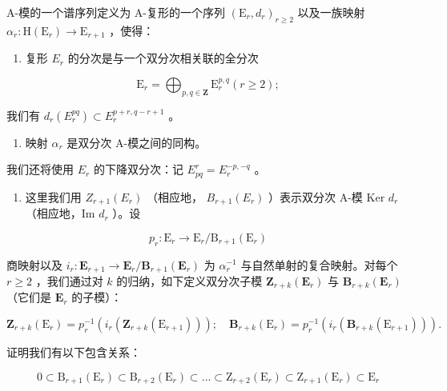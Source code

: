 A-模的一个谱序列定义为 A-复形的一个序列 \((\mathrm{E}_r, d_r)_{r \geqslant 2}\) 以及一族映射 \(\alpha_r: \mathrm{H}(\mathrm{E}_r) \to \mathrm{E}_{r+1}\) ，使得：

\begin{enumerate}
\def\labelenumi{(\roman{enumi})}
\tightlist
\item
  复形 \(E_r\) 的分次是与一个双分次相关联的全分次
\end{enumerate}

\[
\mathrm{E} _ {r} = \bigoplus_ {p, q \in \mathbf {Z}} \mathrm{E} _ {r} ^ {p, q} (r \geqslant 2);
\]

我们有 \(d_r(E_r^{pq}) \subset E_r^{p + r,q - r + 1}\) 。

\begin{enumerate}
\def\labelenumi{(\roman{enumi})}
\setcounter{enumi}{1}
\tightlist
\item
  映射 \(\alpha_{r}\) 是双分次 A-模之间的同构。
\end{enumerate}

我们还将使用 \(E_{r}\) 的下降双分次：记 \(E_{pq}^{r} = E_{r}^{-p, -q}\) 。

\begin{enumerate}
\def\labelenumi{\alph{enumi})}
\tightlist
\item
  这里我们用 \(Z_{r+1}(E_r)\) （相应地， \(B_{r+1}(E_r)\) ）表示双分次 A-模 Ker \(d_r\) （相应地，Im \(d_r\) ）。设
\end{enumerate}

\[
p _ {r}: \mathrm{E} _ {r} \rightarrow \mathrm{E} _ {r} / \mathrm{B} _ {r + 1} (\mathrm{E} _ {r})
\]

商映射以及 \(i_{r}: \mathbf{E}_{r+1} \to \mathbf{E}_{r}/\mathbf{B}_{r+1}(\mathbf{E}_{r})\) 为 \(\alpha_{r}^{-1}\) 与自然单射的复合映射。对每个 \(r \geqslant 2\) ，我们通过对 \(k\) 的归纳，如下定义双分次子模 \(\mathbf{Z}_{r+k}(\mathbf{E}_{r})\) 与 \(\mathbf{B}_{r+k}(\mathbf{E}_{r})\) （它们是 \(\mathbf{E}_{r}\) 的子模）：

\[
\mathbf {Z} _ {r + k} (\mathrm{E} _ {r}) = p _ {r} ^ {- 1} \left(i _ {r} \left(\mathbf {Z} _ {r + k} (\mathrm{E} _ {r + 1})\right)\right); \quad \mathbf {B} _ {r + k} (\mathrm{E} _ {r}) = p _ {r} ^ {- 1} \left(i _ {r} \left(\mathbf {B} _ {r + k} (\mathrm{E} _ {r + 1})\right)\right).
\]

证明我们有以下包含关系：

\[
0 \subset \mathrm{B} _ {r + 1} (\mathrm{E} _ {r}) \subset \mathrm{B} _ {r + 2} (\mathrm{E} _ {r}) \subset \dots \subset \mathrm{Z} _ {r + 2} (\mathrm{E} _ {r}) \subset \mathrm{Z} _ {r + 1} (\mathrm{E} _ {r}) \subset \mathrm{E} _ {r}
\]

